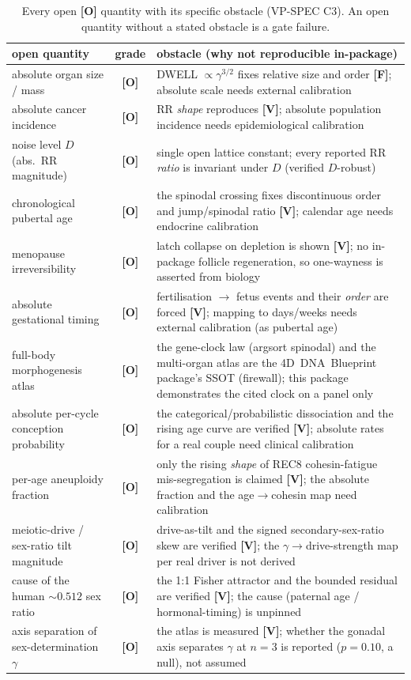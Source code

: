 \documentclass[11pt]{article}
\newcommand{\gradeV}{\textcolor{verified}{\textbf{[V]}}}
\newcommand{\gradeF}{\textcolor{forced}{\textbf{[F]}}}
\newcommand{\gradeO}{\textcolor{open}{\textbf{[O]}}}
\begin{document}
\begin{table}[H]
\centering
\small
\caption{Every open \gradeO{} quantity with its specific obstacle (VP-SPEC C3). An open quantity without a stated obstacle is a gate failure.}
\label{tab:open}
\begin{tabular}{p{3.6cm}cp{8.0cm}}
\toprule
open quantity & grade & obstacle (why not reproducible in-package) \\
\midrule
absolute organ size / mass & \gradeO & DWELL $\propto\gamma^{3/2}$ fixes relative size and order \gradeF{}; absolute scale needs external calibration \\
absolute cancer incidence & \gradeO & RR \emph{shape} reproduces \gradeV{}; absolute population incidence needs epidemiological calibration \\
noise level $D$ (abs.\ RR magnitude) & \gradeO & single open lattice constant; every reported RR \emph{ratio} is invariant under $D$ (verified $D$-robust) \\
chronological pubertal age & \gradeO & the spinodal crossing fixes discontinuous order and jump/spinodal ratio \gradeV{}; calendar age needs endocrine calibration \\
menopause irreversibility & \gradeO & latch collapse on depletion is shown \gradeV{}; no in-package follicle regeneration, so one-wayness is asserted from biology \\
absolute gestational timing & \gradeO & fertilisation $\to$ fetus events and their \emph{order} are forced \gradeV{}; mapping to days/weeks needs external calibration (as pubertal age) \\
full-body morphogenesis atlas & \gradeO & the gene-clock law (argsort spinodal) and the multi-organ atlas are the 4D~DNA~Blueprint package's SSOT (firewall); this package demonstrates the cited clock on a panel only \\
absolute per-cycle conception probability & \gradeO & the categorical/probabilistic dissociation and the rising age curve are verified \gradeV{}; absolute rates for a real couple need clinical calibration \\
per-age aneuploidy fraction & \gradeO & only the rising \emph{shape} of REC8 cohesin-fatigue mis-segregation is claimed \gradeV{}; the absolute fraction and the age$\to$cohesin map need calibration \\
meiotic-drive / sex-ratio tilt magnitude & \gradeO & drive-as-tilt and the signed secondary-sex-ratio skew are verified \gradeV{}; the $\gamma\to$drive-strength map per real driver is not derived \\
cause of the human $\sim0.512$ sex ratio & \gradeO & the 1:1 Fisher attractor and the bounded residual are verified \gradeV{}; the cause (paternal age / hormonal-timing) is unpinned \\
axis separation of sex-determination $\gamma$ & \gradeO & the atlas is measured \gradeV{}; whether the gonadal axis separates $\gamma$ at $n=3$ is reported ($p=0.10$, a null), not assumed \\
\bottomrule
\end{tabular}
\end{table}
\end{document}
